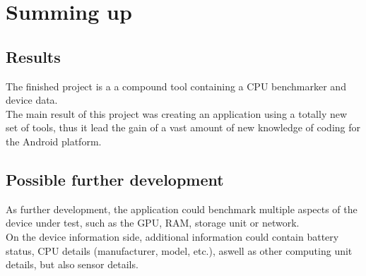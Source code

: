 \documentclass[a4paper,10pt]{report}
\begin{document}
\chapter{Summing up}
 \section{Results}
 The finished project is a a compound tool containing a CPU benchmarker and device data.\\
 The main result of this project was creating an application using a totally new set of tools, thus it lead the gain of a vast amount of new knowledge of coding for the Android platform.\\
 \section{Possible further development}
 As further development, the application could benchmark multiple aspects of the device under test, such as the GPU, RAM, storage unit or network.\\
 On the device information side, additional information could contain battery status, CPU details (manufacturer, model, etc.), aswell as other computing unit details, but also sensor details.\\
\end{document}
